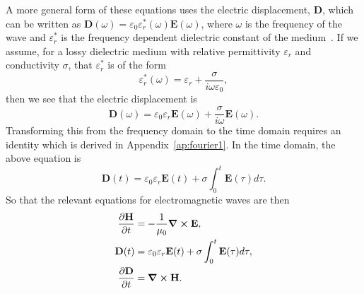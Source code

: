 \documentclass[12pt,twocolumn]{article}
\begin{document}
A more general form of these equations uses the electric displacement, $\mathbf{D}$, which can be written as $\mathbf{D}(\omega) = \varepsilon_0\varepsilon_r^*(\omega)\mathbf{E}(\omega)$, where $\omega$ is the frequency of the wave and $\varepsilon^*_r$ is the frequency dependent dielectric constant of the medium~\cite{Sullivan00}. If we assume, for a lossy dielectric medium with relative permittivity $\varepsilon_r$ and conductivity $\sigma$, that $\varepsilon^*_r$ is of the form
\begin{equation}
\label{eq:epsilon_form}
\varepsilon^*_r(\omega) = \varepsilon_r + \frac{\sigma}{i\omega\varepsilon_0},
\end{equation}
then we see that the electric displacement is
\begin{equation}
\mathbf{D}(\omega) = \varepsilon_0\varepsilon_r \mathbf{E}(\omega) + \frac{\sigma}{i\omega}\mathbf{E}(\omega).
\end{equation}
Transforming this from the frequency domain to the time domain requires an identity which is derived in Appendix~\ref{ap:fourier1}. In the time domain, the above equation is
\begin{equation}
\mathbf{D}(t) = \varepsilon_0\varepsilon_r \mathbf{E}(t)+\sigma\int_0^t\mathbf{E}(\tau)d\tau.
\end{equation}
So that the relevant equations for electromagnetic waves are then
\begin{subequations}
\begin{align}
\label{eq:dH_dt_SI}\frac{\partial\mathbf{H}}{\partial t} &= -\frac{1}{\mu_0}\curl{\mathbf{E}}, \\
\label{eq:D_time_SI}\mathbf{D}(t) &= \varepsilon_0\varepsilon_r \mathbf{E}(t)+\sigma\int_0^t\mathbf{E}(\tau)d\tau, \\
\label{eq:dD_dt_SI}\frac{\partial\mathbf{D}}{\partial t} &= \curl{\mathbf{H}}.
\end{align}
\end{subequations}
\end{document}
